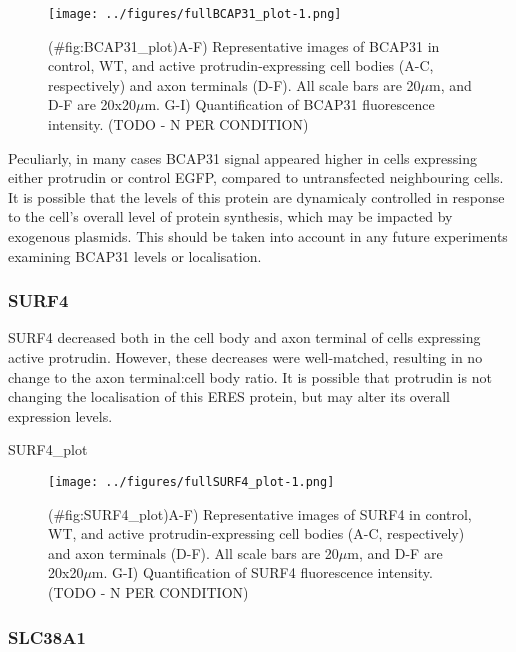 \documentclass[
  12pt,
  a4paper,
]{book}
\newenvironment{Shaded}{\begin{snugshade}}{\end{snugshade}}
\newcommand{\NormalTok}[1]{#1}
\begin{document}
\begin{figure}
\centering
\texttt{[image: ../figures/fullBCAP31\_plot-1.png]}
\caption{(\#fig:BCAP31\_plot)A-F) Representative images of BCAP31 in control, WT, and active protrudin-expressing cell bodies (A-C, respectively) and axon terminals (D-F). All scale bars are 20\(\mu\)m, and D-F are 20x20\(\mu\)m. G-I) Quantification of BCAP31 fluorescence intensity. (TODO - N PER CONDITION)}
\end{figure}

Peculiarly, in many cases BCAP31 signal appeared higher in cells expressing either protrudin or control EGFP, compared to untransfected neighbouring cells. It is possible that the levels of this protein are dynamicaly controlled in response to the cell's overall level of protein synthesis, which may be impacted by exogenous plasmids. This should be taken into account in any future experiments examining BCAP31 levels or localisation.

\hypertarget{surf4}{%
\subsubsection{SURF4}\label{surf4}}

SURF4 decreased both in the cell body and axon terminal of cells expressing active protrudin. However, these decreases were well-matched, resulting in no change to the axon terminal:cell body ratio. It is possible that protrudin is not changing the localisation of this ERES protein, but may alter its overall expression levels.

\begin{Shaded}
\begin{Highlighting}[]
\NormalTok{SURF4\_plot}
\end{Highlighting}
\end{Shaded}

\begin{figure}
\centering
\texttt{[image: ../figures/fullSURF4\_plot-1.png]}
\caption{(\#fig:SURF4\_plot)A-F) Representative images of SURF4 in control, WT, and active protrudin-expressing cell bodies (A-C, respectively) and axon terminals (D-F). All scale bars are 20\(\mu\)m, and D-F are 20x20\(\mu\)m. G-I) Quantification of SURF4 fluorescence intensity. (TODO - N PER CONDITION)}
\end{figure}

\hypertarget{slc38a1}{%
\subsubsection{SLC38A1}\label{slc38a1}}
\end{document}
